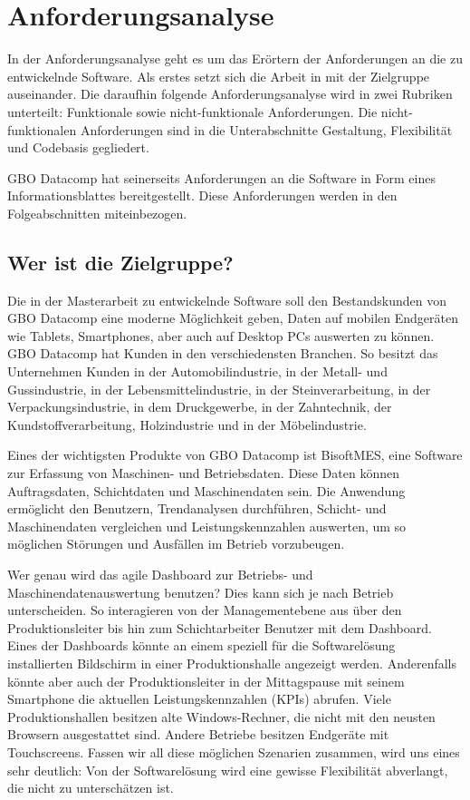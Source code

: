 \chapter{Anforderungsanalyse}
\label{chap:anforderungsanalyse}

In der Anforderungsanalyse geht es um das Erörtern der Anforderungen an die zu entwickelnde Software.
Als erstes setzt sich die Arbeit in  mit der
Zielgruppe auseinander. Die daraufhin folgende Anforderungsanalyse wird in zwei
Rubriken unterteilt: Funktionale sowie nicht-funktionale Anforderungen. Die
nicht-funktionalen Anforderungen sind in die Unterabschnitte Gestaltung, Flexibilität
und Codebasis gegliedert.

GBO Datacomp hat seinerseits Anforderungen an die Software in Form eines Informationsblattes
bereitgestellt. Diese Anforderungen werden in den Folgeabschnitten miteinbezogen.

\section{Wer ist die Zielgruppe?}
\label{sec:weristmeinezielgruppe}
Die in der Masterarbeit zu entwickelnde Software
soll den Bestandskunden von GBO Datacomp eine moderne Möglichkeit geben, Daten 
auf mobilen Endgeräten wie Tablets, Smartphones, aber auch auf Desktop PCs auswerten zu können.
GBO Datacomp hat Kunden in den verschiedensten Branchen. So besitzt das Unternehmen
Kunden in der Automobilindustrie, in der Metall- und Gussindustrie, in der Lebensmittelindustrie,
in der Steinverarbeitung, in der Verpackungsindustrie, in dem Druckgewerbe, in der
Zahntechnik, der Kundstoffverarbeitung, Holzindustrie und in der Möbelindustrie.\cite{GBODatacompBranchenloesungen}

Eines der wichtigsten Produkte von GBO Datacomp ist BisoftMES, eine Software zur Erfassung von
Maschinen- und Betriebsdaten. Diese Daten können Auftragsdaten, Schichtdaten und Maschinendaten sein.
Die Anwendung ermöglicht den Benutzern, Trendanalysen durchführen, Schicht- und Maschinendaten vergleichen und
Leistungskennzahlen auswerten, um so möglichen Störungen und Ausfällen im Betrieb vorzubeugen.

Wer genau wird das agile Dashboard zur Betriebs- und Maschinendatenauswertung
benutzen? Dies kann sich je nach Betrieb unterscheiden. So interagieren von der
Managementebene aus über den Produktionsleiter bis hin zum Schichtarbeiter Benutzer mit dem
Dashboard. Eines der Dashboards könnte an einem speziell für die Softwarelösung
installierten Bildschirm in einer Produktionshalle angezeigt werden. Anderenfalls könnte aber
auch der Produktionsleiter in der Mittagspause mit seinem Smartphone die aktuellen Leistungskennzahlen 
(KPIs) abrufen. Viele Produktionshallen besitzen alte Windows-Rechner, die nicht
mit den neusten Browsern ausgestattet sind. Andere Betriebe besitzen Endgeräte mit Touchscreens.
Fassen wir all diese möglichen Szenarien zusammen, wird uns eines sehr deutlich: Von der
Softwarelösung wird eine gewisse Flexibilität abverlangt, die nicht zu unterschätzen ist.

